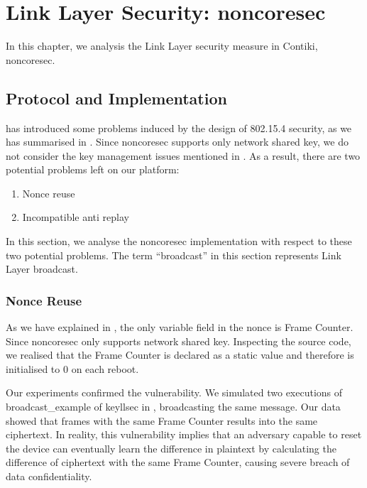 \chapter{Link Layer Security: noncoresec} \label{Chp: LLSEC}

In this chapter, we analysis the Link Layer security measure in Contiki, noncoresec.

\section{Protocol and Implementation}

\cite{802154sec} has introduced some problems induced by the design of 802.15.4 security, as we has summarised in . Since noncoresec supports only network shared key, we do not consider the key management issues mentioned in \cite{802154sec}. As a result, there are two potential problems left on our platform:

\begin{enumerate}
	\item Nonce reuse
	\item Incompatible anti replay
\end{enumerate}

In this section, we analyse the noncoresec implementation with respect to these two potential problems. The term ``broadcast'' in this section represents Link Layer broadcast.

\subsection{Nonce Reuse}

As we have explained in , the only variable field in the nonce is Frame Counter. Since noncoresec only supports network shared key. Inspecting the source code, we realised that the Frame Counter is declared as a static value and therefore is initialised to $0$ on each reboot.

Our experiments confirmed the vulnerability. We simulated two executions of  broadcast\_example of keyllsec in , broadcasting the same message. Our data\cite{NonceReuseData} showed that frames with the same Frame Counter results into the same ciphertext. In reality, this vulnerability implies that an adversary capable to reset the device can eventually learn the difference in plaintext by calculating the difference of ciphertext with the same Frame Counter, causing severe breach of data confidentiality.

